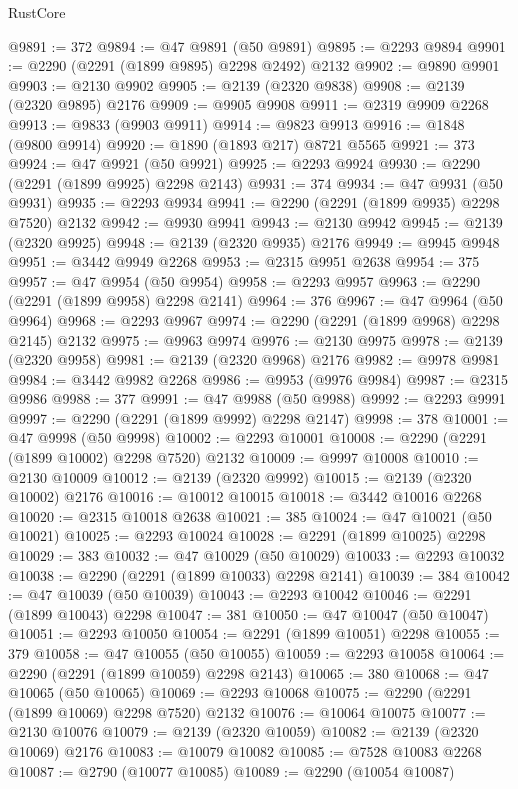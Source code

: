 \begin{lexlean}{RustCore}
\begin{coremodule}
@9891 := 372
@9894 := @47 @9891 (@50 @9891)
@9895 := @2293 @9894
@9901 := @2290 (@2291 (@1899 @9895) @2298 @2492) @2132
@9902 := @9890 @9901
@9903 := @2130 @9902
@9905 := @2139 (@2320 @9838)
@9908 := @2139 (@2320 @9895) @2176
@9909 := @9905 @9908
@9911 := @2319 @9909 @2268
@9913 := @9833 (@9903 @9911)
@9914 := @9823 @9913
@9916 := @1848 (@9800 @9914)
@9920 := @1890 (@1893 @217) @8721 @5565
@9921 := 373
@9924 := @47 @9921 (@50 @9921)
@9925 := @2293 @9924
@9930 := @2290 (@2291 (@1899 @9925) @2298 @2143)
@9931 := 374
@9934 := @47 @9931 (@50 @9931)
@9935 := @2293 @9934
@9941 := @2290 (@2291 (@1899 @9935) @2298 @7520) @2132
@9942 := @9930 @9941
@9943 := @2130 @9942
@9945 := @2139 (@2320 @9925)
@9948 := @2139 (@2320 @9935) @2176
@9949 := @9945 @9948
@9951 := @3442 @9949 @2268
@9953 := @2315 @9951 @2638
@9954 := 375
@9957 := @47 @9954 (@50 @9954)
@9958 := @2293 @9957
@9963 := @2290 (@2291 (@1899 @9958) @2298 @2141)
@9964 := 376
@9967 := @47 @9964 (@50 @9964)
@9968 := @2293 @9967
@9974 := @2290 (@2291 (@1899 @9968) @2298 @2145) @2132
@9975 := @9963 @9974
@9976 := @2130 @9975
@9978 := @2139 (@2320 @9958)
@9981 := @2139 (@2320 @9968) @2176
@9982 := @9978 @9981
@9984 := @3442 @9982 @2268
@9986 := @9953 (@9976 @9984)
@9987 := @2315 @9986
@9988 := 377
@9991 := @47 @9988 (@50 @9988)
@9992 := @2293 @9991
@9997 := @2290 (@2291 (@1899 @9992) @2298 @2147)
@9998 := 378
@10001 := @47 @9998 (@50 @9998)
@10002 := @2293 @10001
@10008 := @2290 (@2291 (@1899 @10002) @2298 @7520) @2132
@10009 := @9997 @10008
@10010 := @2130 @10009
@10012 := @2139 (@2320 @9992)
@10015 := @2139 (@2320 @10002) @2176
@10016 := @10012 @10015
@10018 := @3442 @10016 @2268
@10020 := @2315 @10018 @2638
@10021 := 385
@10024 := @47 @10021 (@50 @10021)
@10025 := @2293 @10024
@10028 := @2291 (@1899 @10025) @2298
@10029 := 383
@10032 := @47 @10029 (@50 @10029)
@10033 := @2293 @10032
@10038 := @2290 (@2291 (@1899 @10033) @2298 @2141)
@10039 := 384
@10042 := @47 @10039 (@50 @10039)
@10043 := @2293 @10042
@10046 := @2291 (@1899 @10043) @2298
@10047 := 381
@10050 := @47 @10047 (@50 @10047)
@10051 := @2293 @10050
@10054 := @2291 (@1899 @10051) @2298
@10055 := 379
@10058 := @47 @10055 (@50 @10055)
@10059 := @2293 @10058
@10064 := @2290 (@2291 (@1899 @10059) @2298 @2143)
@10065 := 380
@10068 := @47 @10065 (@50 @10065)
@10069 := @2293 @10068
@10075 := @2290 (@2291 (@1899 @10069) @2298 @7520) @2132
@10076 := @10064 @10075
@10077 := @2130 @10076
@10079 := @2139 (@2320 @10059)
@10082 := @2139 (@2320 @10069) @2176
@10083 := @10079 @10082
@10085 := @7528 @10083 @2268
@10087 := @2790 (@10077 @10085)
@10089 := @2290 (@10054 @10087)

\end{coremodule}
\end{lexlean}
